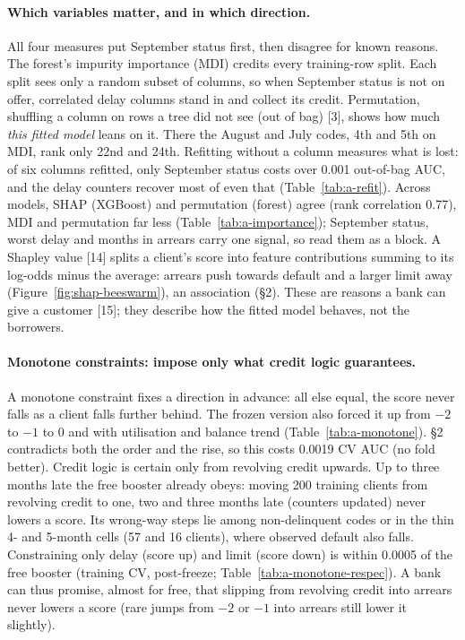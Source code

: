 \paragraph{Which variables matter, and in which direction.}
All four measures put September status first, then disagree for known reasons. The forest's impurity importance (MDI) credits every training-row split. Each split sees only a random subset of columns, so when September status is not on offer, correlated delay columns stand in and collect its credit. Permutation, shuffling a column on rows a tree did not see (out of bag) [3], shows how much \emph{this fitted model} leans on it. There the August and July codes, 4th and 5th on MDI, rank only 22nd and 24th. Refitting without a column measures what is lost: of six columns refitted, only September status costs over 0.001 out-of-bag AUC, and the delay counters recover most of even that (Table~\ref{tab:a-refit}). Across models, SHAP (XGBoost) and permutation (forest) agree (rank correlation 0.77), MDI and permutation far less (Table~\ref{tab:a-importance}); September status, worst delay and months in arrears carry one signal, so read them as a block. A Shapley value [14] splits a client's score into feature contributions summing to its log-odds minus the average: arrears push towards default and a larger limit away (Figure~\ref{fig:shap-beeswarm}), an association (\S2). These are reasons a bank can give a customer [15]; they describe how the fitted model behaves, not the borrowers.

\paragraph{Monotone constraints: impose only what credit logic guarantees.}
A monotone constraint fixes a direction in advance: all else equal, the score never falls as a client falls further behind. The frozen version also forced it up from $-2$ to $-1$ to 0 and with utilisation and balance trend (Table~\ref{tab:a-monotone}). \S2 contradicts both the order and the rise, so this costs 0.0019 CV AUC (no fold better). Credit logic is certain only from revolving credit upwards. Up to three months late the free booster already obeys: moving 200 training clients from revolving credit to one, two and three months late (counters updated) never lowers a score. Its wrong-way steps lie among non-delinquent codes or in the thin 4- and 5-month cells (57 and 16 clients), where observed default also falls. Constraining only delay (score up) and limit (score down) is within 0.0005 of the free booster (training CV, post-freeze; Table~\ref{tab:a-monotone-respec}). A bank can thus promise, almost for free, that slipping from revolving credit into arrears never lowers a score (rare jumps from $-2$ or $-1$ into arrears still lower it slightly).

